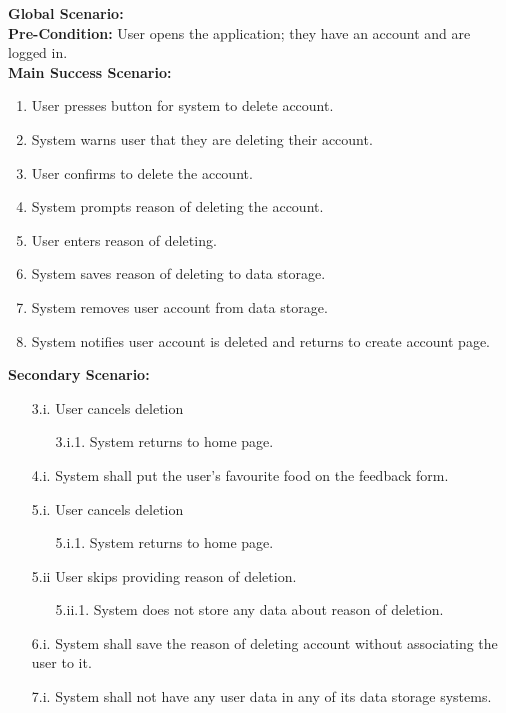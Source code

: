 \documentclass[]{article}
\begin{document}
\begin{enumerate}[{\bf BE1.}]
		{\bf Global Scenario:} \\
		\textbf{Pre-Condition:} User opens the application; they have an account and are logged in. \\
		\textbf{Main Success Scenario:} 
		\begin{enumerate}[{1.}]
			\item User presses button for system to delete account.
			\item System warns user that they are deleting their account.
			\item User confirms to delete the account.
			\item System prompts reason of deleting the account.
			\item User enters reason of deleting.
			\item System saves reason of deleting to data storage.
			\item System removes user account from data storage.
			\item System notifies user account is deleted and returns to create account page.
		\end{enumerate}
		\textbf{Secondary Scenario:}
		\begin{enumerate}
			\item[3.i.] User cancels deletion
			\begin{enumerate}
				\item[3.i.1.] System returns to home page. 
			\end{enumerate}
		\end{enumerate}
		\begin{enumerate}
			\item[4.i.] System shall put the user's favourite food on the feedback form.
			\item[5.i.] User cancels deletion
			\begin{enumerate}
				\item[5.i.1.] System returns to home page. 
			\end{enumerate}
			\item [5.ii] User skips providing reason of deletion.
			\begin{enumerate}
				\item[5.ii.1.] System does not store any data about reason of deletion.
			\end{enumerate}
			\item [6.i.] System shall save the reason of deleting account without associating the user to it.
			\item [7.i.] System shall not have any user data in any of its data storage systems.
		\end{enumerate}
		
\end{enumerate}
\end{document}
